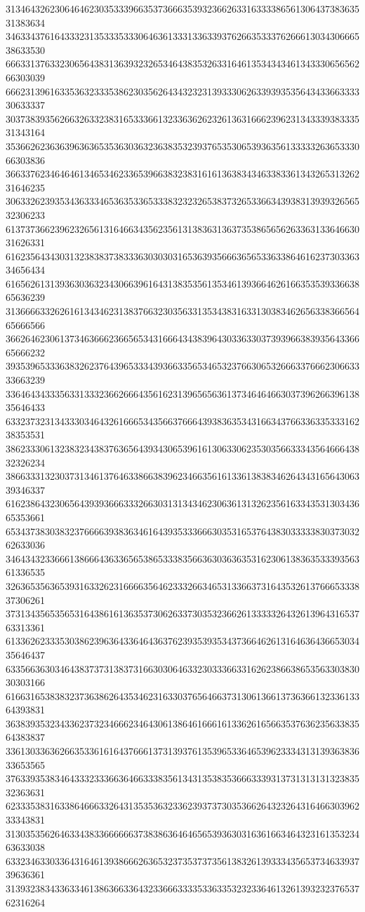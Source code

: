 31346432623064646230353339663537366635393236626331633338656130643738363531383634
34633437616433323135333533306463613331336339376266353337626661303430666538633530
66633137633230656438313639323265346438353263316461353434346134333065656266303039
66623139616335363233353862303562643432323139333062633939353564343366333330633337
30373839356266326332383165333661323363626232613631666239623134333938333531343164
35366262363639636365353630363236383532393765353065393635613333326365333066303836
36633762346464613465346233653966383238316161363834346338336134326531326231646235
30633262393534363334653635336533383232326538373265336634393831393932656532306233
61373736623962326561316466343562356131383631363735386565626336313364663031626331
61623564343031323838373833363030303165363935666365653363386461623730336334656434
61656261313936303632343066396164313835356135346139366462616635353933663865636239
31366663326261613434623138376632303563313534383163313038346265633836656465666566
36626462306137346366623665653431666434383964303363303739396638393564336665666232
39353965333638326237643965333439366335653465323766306532666337666230663333663239
33646434333563313332366266643561623139656563613734646466303739626639613835646433
63323732313433303464326166653435663766643938363534316634376633633533316238353531
38623330613238323438376365643934306539616130633062353035663334356466643832326234
38663331323037313461376463386638396234663561613361383834626434316564306339346337
61623864323065643939366633326630313134346230636131326235616334353130343665353661
65343738303832376666393836346164393533366630353165376438303333383037303262633036
34643432336661386664363365653865333835663630363635316230613836353339356361336535
32636535636539316332623166663564623332663465313366373164353261376665333837306261
37313435653565316438616136353730626337303532366261333332643261396431653763313361
61336262333530386239636433646436376239353935343736646261316463643665303435646437
63356636303464383737313837316630306463323033366331626238663865356330383030303166
61663165383832373638626435346231633037656466373130613661373636613233613364393831
36383935323433623732346662346430613864616661613362616566353763623563383564383837
33613033636266353361616437666137313937613539653364653962333431313936383633653565
37633935383464333233366364663338356134313538353666333931373131313132383532363631
62333538316338646663326431353536323362393737303536626432326431646630396233343831
31303535626463343833666666373838636464656539363031636166346432316135323463633038
63323463303364316461393866626365323735373735613832613933343565373463393739636361
31393238343363346138636633643233666333353363353232336461326139323237653762316264
